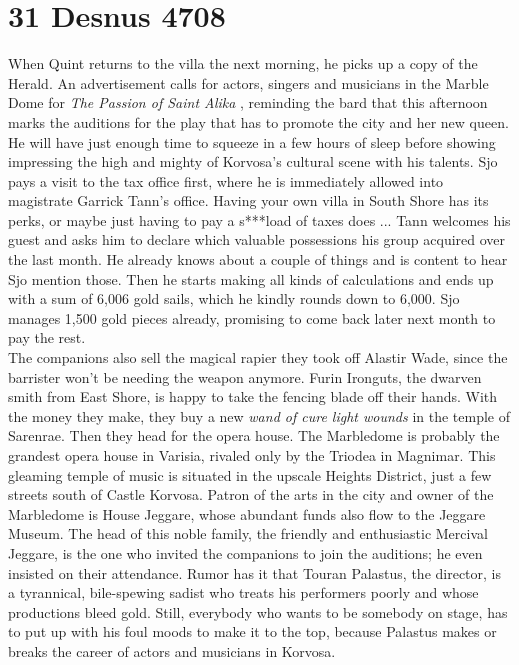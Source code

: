 \section{31 Desnus 4708}

When Quint returns to the villa the next morning, he picks up a copy of the Herald. An advertisement calls for actors, singers and musicians in the Marble Dome for {\itshape The Passion of Saint Alika} , reminding the bard that this afternoon marks the auditions for the play that has to promote the city and her new queen. He will have just enough time to squeeze in a few hours of sleep before showing impressing the high and mighty of Korvosa's cultural scene with his talents. Sjo pays a visit to the tax office first, where he is immediately allowed into magistrate Garrick Tann's office. Having your own villa in South Shore has its perks, or maybe just having to pay a s***load of taxes does ... Tann welcomes his guest and asks him to declare which valuable possessions his group acquired over the last month. He already knows about a couple of things and is content to hear Sjo mention those. Then he starts making all kinds of calculations and ends up with a sum of 6,006 gold sails, which he kindly rounds down to 6,000. Sjo manages 1,500 gold pieces already, promising to come back later next month to pay the rest.\\

The companions also sell the magical rapier they took off Alastir Wade, since the barrister won't be needing the weapon anymore. Furin Ironguts, the dwarven smith from East Shore, is happy to take the fencing blade off their hands. With the money they make, they buy a new {\itshape wand of cure light wounds} in the temple of Sarenrae. Then they head for the opera house. The Marbledome is probably the grandest opera house in Varisia, rivaled only by the Triodea in Magnimar. This gleaming temple of music is situated in the upscale Heights District, just a few streets south of Castle Korvosa. Patron of the arts in the city and owner of the Marbledome is House Jeggare, whose abundant funds also flow to the Jeggare Museum. The head of this noble family, the friendly and enthusiastic Mercival Jeggare, is the one who invited the companions to join the auditions; he even insisted on their attendance. Rumor has it that Touran Palastus, the director, is a tyrannical, bile-spewing sadist who treats his performers poorly and whose productions bleed gold. Still, everybody who wants to be somebody on stage, has to put up with his foul moods to make it to the top, because Palastus makes or breaks the career of actors and musicians in Korvosa.\\

